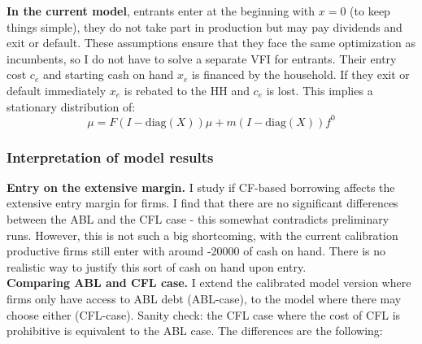 \documentclass[12pt]{article}
\begin{document}
\textbf{In the current model}, entrants enter at the beginning with $x = 0$ (to keep things simple), they do not take part in production but may pay dividends and exit or default. These assumptions ensure that they face the same optimization as incumbents, so I do not have to solve a separate VFI for entrants. Their entry cost $c_e$ and starting cash on hand $x_e$ is financed by the household. If they exit or default immediately $x_e$ is rebated to the HH and $c_e$ is lost. This implies a stationary distribution of:
$$ \mu = F(I-\text{diag}(X)) \mu + m(I-\text{diag}(X))f^0 $$
\newpage

\subsubsection*{Interpretation of model results}
\textbf{Entry on the extensive margin.} I study if CF-based borrowing affects the extensive entry margin for firms. I find that there are no significant differences between the ABL and the CFL case - this somewhat contradicts preliminary runs. However, this is not such a big shortcoming, with the current calibration productive firms still enter with around -20000 of cash on hand. There is no realistic way to justify this sort of cash on hand upon entry. \vspace{3mm} \\
\textbf{Comparing ABL and CFL case.} I extend the calibrated model version where firms only have access to ABL debt (ABL-case), to the model where there may choose either (CFL-case). Sanity check: the CFL case where the cost of CFL is prohibitive is equivalent to the ABL case. The differences are the following: 
\end{document}
